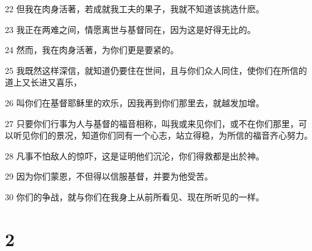 \par 22 但我在肉身活著，若成就我工夫的果子，我就不知道该挑选什麽。
\par 23 我正在两难之间，情愿离世与基督同在，因为这是好得无比的。
\par 24 然而，我在肉身活著，为你们更是要紧的。
\par 25 我既然这样深信，就知道仍要住在世间，且与你们众人同住，使你们在所信的道上又长进又喜乐，
\par 26 叫你们在基督耶稣里的欢乐，因我再到你们那里去，就越发加增。
\par 27 只要你们行事为人与基督的福音相称，叫我或来见你们，或不在你们那里，可以听见你们的景况，知道你们同有一个心志，站立得稳，为所信的福音齐心努力。
\par 28 凡事不怕敌人的惊吓，这是证明他们沉沦，你们得救都是出於神。
\par 29 因为你们蒙恩，不但得以信服基督，并要为他受苦。
\par 30 你们的争战，就与你们在我身上从前所看见、现在所听见的一样。

\chapter{2}

